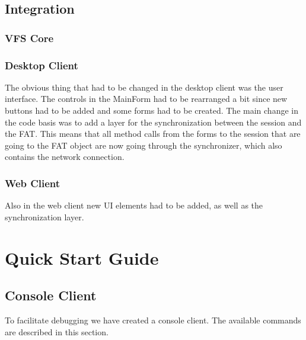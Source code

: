 \documentclass[a4paper,12pt]{article}
\begin{document}
\subsection{Integration}

\subsubsection{VFS Core}

\subsubsection{Desktop Client}
The obvious thing that had to be changed in the desktop client was the user interface. The controls in the MainForm had to be rearranged a bit since new buttons had to be added and some forms had to be created. The main change in the code basis was to add a layer for the synchronization between the session and the FAT. This means that all method calls from the forms to the session that are going to the FAT object are now going through the synchronizer, which also contains the network connection. 

\subsubsection{Web Client}
Also in the web client new UI elements had to be added, as well as the synchronization layer.




\section{Quick Start Guide}

\subsection{Console Client}
To facilitate debugging we have created a console client. The available commands are described in this section.
\end{document}
